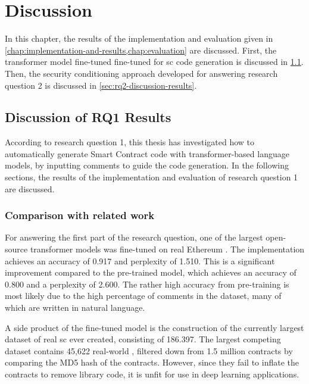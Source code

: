 \chapter{Discussion}
\label{chap:discussion}
In this chapter, the results of the implementation and evaluation given in \cref{chap:implementation-and-results,chap:evaluation} are discussed. First, the transformer model fine-tuned fine-tuned for \acrshort{sc} code generation is discussed in \cref{sec:rq1-discussion-results}. Then, the security conditioning approach developed for answering research question 2 is discussed in \cref{sec:rq2-discussion-results}.

\section{Discussion of RQ1 Results}
\label{sec:rq1-discussion-results}
According to research question 1, this thesis has investigated how to automatically generate Smart Contract code with transformer-based language models, by inputting comments to guide the code generation. In the following sections, the results of the implementation and evaluation of research question 1 are discussed.

\subsection{Comparison with related work}
\label{sec:rq1-comparison-with-related-work}
For answering the first part of the research question, one of the largest open-source transformer models was fine-tuned on real Ethereum . The implementation achieves an accuracy of 0.917 and perplexity of 1.510. This is a significant improvement compared to the pre-trained model, which achieves an accuracy of 0.800 and a perplexity of 2.600. The rather high accuracy from pre-training is most likely due to the high percentage of comments in the dataset, many of which are written in natural language.

A side product of the fine-tuned model is the construction of the currently largest dataset of real \acrshort{sc} ever created, consisting of 186.397. The largest competing dataset \cite{ren2021empirical} contains 45,622 real-world , filtered down from 1.5 million contracts by comparing the MD5 hash of the contracts. However, since they fail to inflate the contracts to remove library code, it is unfit for use in deep learning applications.

